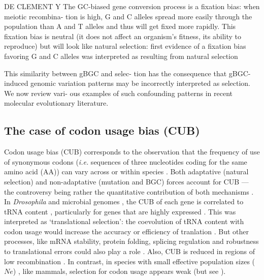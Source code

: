 DE CLEMENT Y
The GC-biased gene conversion process is a fixation bias: when meiotic recombina- tion is high, G and C alleles spread more easily through the population than A and T alleles and thus will get fixed more rapidly. This fixation bias is neutral (it does not affect an organism’s fitness, its ability to reproduce) but will look like natural selection: first evidence of a fixation bias favoring G and C alleles was interpreted as resulting from natural selection


This similarity between gBGC and selec- tion has the consequence that gBGC-induced genomic variation patterns may be incorrectly interpreted as selection. We now review vari- ous examples of such confounding patterns in recent molecular evolutionary literature.

\subsection{The case of codon usage bias (CUB)}

Codon usage bias (CUB) corresponds to the observation that the frequency of use of synonymous codons (\textit{i.e.} sequences of three nucleotides coding for the same amino acid (AA)) can vary across or within species \citep{fitch1976there}.
Both adaptative (natural selection) and non-adaptative (mutation \citep{marais2001synonymous} and BGC) forces account for CUB \citep{bulmer1991selectionmutationdrift} — the controversy being rather the quantitative contribution of both mechanisms \citep{pouyet2016etude}.\\

In \textit{Drosophila} and microbial genomes \citep{ikemura1985codon}, the CUB of each gene is correlated to tRNA content \citep{akashi1994synonymous,duret1999expression,behura2011coadaptation}, particularly for genes that are highly expressed \citep{chavancy1979adaptation,shields1988silent,moriyama1997codon}.
This was interpreted as ‘translational selection’: the coevolution of tRNA content with codon usage would increase the accuracy or efficiency of tranlation \citep{sharp1995dna,duret2002evolution}.
But other processes, like mRNA stability, protein folding, splicing regulation and robustness to translational errors could also play a role \citep[reviewed in \citealp{clement2017evolutionary}]{chamary2006hearing,cusack2011preventing,plotkin2011synonymous}.
Also, CUB is reduced in regions of low recombination \citep{kliman1993reduced}.
In contrast, in species with small effective population sizes ($Ne$) \citep{subramanian2008nearly,galtier2018codon}, like mammals, selection for codon usage appears weak (but see \citealp{chamary2006hearing}).

